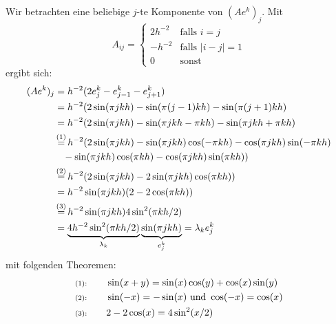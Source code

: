 \documentclass[11pt]{article}
\theoremstyle{plain}
\theoremstyle{definition}
\newcommand{\equalstar}{\mathop{=}\limits^{(1)}}
\newcommand{\equalsstar}{\mathop{=}\limits^{(2)}}
\newcommand{\equalssstar}{\mathop{=}\limits^{(3)}}
\begin{document}
Wir betrachten eine beliebige $j$-te Komponente von $(Ae^k)_j$. Mit
\begin{equation}
A_{ij} =
 \begin{cases}
   2h^{-2}  & \text{falls } i=j \\
   -h^{-2}  & \text{falls } |i-j|=1 \\
   0 & \text{sonst }
  \end{cases}
\end{equation}
ergibt sich:
\begin{align*}
(Ae^k)_j 
&= h^{-2} ( 2e^k_j - e^k_{j-1} - e^k_{j+1} ) \\
&= h^{-2} ( 2\sin(\pi jkh) - \sin(\pi (j-1)kh) - \sin(\pi (j+1)kh) \\
&= h^{-2} ( 2\sin(\pi jkh) - \sin(\pi jkh - \pi kh) - \sin(\pi jkh + \pi kh) \\
&\equalstar h^{-2} ( 2\sin(\pi jkh) - \sin(\pi jkh)\cos(- \pi kh) -\cos(\pi jkh)\sin(-\pi kh) \\ & \hspace{0.3cm}- \sin(\pi jkh)\cos(\pi kh) - \cos(\pi jkh)\sin(\pi kh)) \\
&\equalsstar h^{-2} ( 2\sin(\pi jkh) - 2\sin(\pi jkh)\cos(\pi kh)) \\
&= h^{-2}\sin(\pi jkh) ( 2 - 2\cos(\pi kh)) \\
&\equalssstar h^{-2}\sin(\pi jkh)  4\sin^2(\pi kh/2) \\ 
&= \underbrace{4h^{-2}\sin^2(\pi kh/2)}_{\lambda_k}\underbrace{\sin(\pi jkh)}_{e^k_j} = \lambda_k e^k_j
\end{align*}
mit folgenden Theoremen:
\begin{align*}
\text{\scriptsize{(1):}}& \qquad \sin(x+y) = \sin(x)\cos(y) + \cos(x)\sin(y) \\ 
\text{\scriptsize{(2):}}& \qquad \sin(-x) = -\sin(x) \text{ und } \cos(-x) = \cos(x)\\ 
\text{\scriptsize{(3):}}& \qquad 2-2\cos(x) = 4\sin^2(x/2) 
\end{align*}
\end{document}
